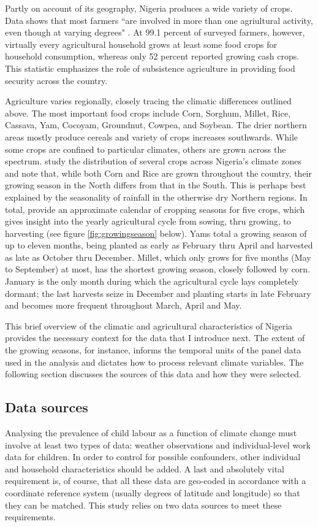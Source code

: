 \documentclass[a4paper,12pt]{article}
\theoremstyle{plain}
\theoremstyle{definition}
\theoremstyle{definition}
\theoremstyle{definition}
\theoremstyle{definition}
\begin{document}
Partly on account of its geography, Nigeria produces a wide variety of crops. Data shows that most farmers ``are involved in more than one agriultural activity, even though at varying degrees" \citep[][p. 99]{naerls2015}. At 99.1 percent of surveyed farmers, however, virtually every agricultural household grows at least some food crops for household consumption, whereas only 52 percent reported growing cash crops. This statistic emphasizes the role of subsistence agriculture in providing food security across the country.

Agriculture varies regionally, closely tracing the climatic differences outlined above. The most important food crops include Corn, Sorghum, Millet, Rice, Cassava, Yam, Cocoyam, Groundnut, Cowpea, and Soybean. The drier northern areas mostly produce cereals and variety of crops increases southwards. While some crops are confined to particular climates, others are grown across the spectrum. \citet{shiru2019} study the distribution of several crops across Nigeria's climate zones and note that, while both Corn and Rice are grown throughout the country,
their growing season in the North differs from that in the South. This is perhaps best explained by the seasonality of rainfall in the otherwise dry Northern regions. In total, \citet{shiru2019} provide an approximate calendar of cropping seasons for five crops, which gives insight into the yearly agricultural cycle from sowing, thru growing, to harvesting (see figure \ref{fig:growingseason} below). Yams total a growing season of up to eleven months, being planted as early as February thru April and harvested as late as October thru December. Millet, which only grows for five months (May to September) at most, has the shortest growing season, closely followed by corn. January is the only month during which the agricultural cycle lays completely dormant; the last harvests seize in December and planting starts in late February and becomes more frequent throughout March, April and May.

This brief overview of the climatic and agricultural characteristics of Nigeria provides the necessary context for the data that I introduce next. The extent of the growing seasons, for instance, informs the temporal units of the panel data used in the analysis and dictates how to process relevant climate variables. The following section discusses the sources of this data and how they were selected.

\subsection{Data sources}
\label{sub:data_sources}
Analysing the prevalence of child labour as a function of climate change must involve at least two types of data: weather observations and individual-level work data for children. In order to control for possible confounders, other individual and household characteristics should be added. A last and absolutely vital requirement is, of course, that all these data are geo-coded in accordance with a coordinate reference system (usually degrees of latitude and longitude) so that they can be matched. This study relies on two data sources to meet these requirements.
\end{document}

